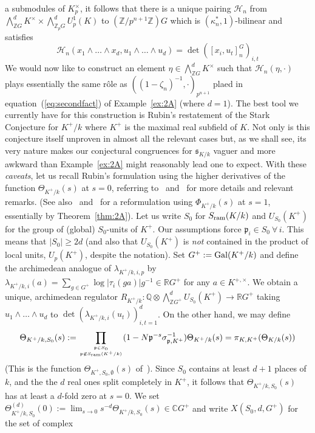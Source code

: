 \documentclass[12pt]{article}
\newcounter{rem}[section]%
\newcommand{\bbC}{\ensuremath{\mathbb{C}}}
\newcommand{\bbQ}{\ensuremath{\mathbb{Q}}}
\newcommand{\bbR}{\ensuremath{\mathbb{R}}}
\newcommand{\bbZ}{\ensuremath{\mathbb{Z}}}
\newcommand{\cH}{\ensuremath{\mathcal{H}}}
\newcommand{\fp}{\ensuremath{\mathfrak{p}}}
\newcommand{\fs}{\ensuremath{\mathfrak{s}}}
\newcommand{\Gal}{{\rm Gal}}
\newcommand{\inv}{^{-1}}%
\newcommand{\nin}{\not\in}
\newcommand{\refeq}[1]{~(\ref{eq:#1})}
\newcommand{\rem}{\refstepcounter{rem}\noindent{\sc Remark \therem}}%
\renewcommand{\therem}{\thesection.\arabic{rem}}
\newcommand{\pnpo}{\ensuremath{{p^{n+1}}}}
\newcommand{\sKk}{\ensuremath{\fs_{K/k}}}
\begin{document}
a submodules of $K_p^\times$, it follows that there is a
unique pairing
$\cH_n$ from
$\bigwedge^d_{\bbZ G}K^\times\times\bigwedge^d_{\bbZ_p G} U^1_p(K)$
to $(\bbZ/\pnpo\bbZ)G$ which
is $(\kappa_n^\ast,1)$-bilinear
and satisfies
\[
\cH_n(x_1\wedge\ldots\wedge x_d,u_1\wedge\ldots\wedge u_d)=\det([x_i,u_t]^G_n)_{i,t}
\]
We would now like to construct an element $\eta\in\bigwedge^d_{\bbZ G}K^\times$
such that $\cH_n(\eta,\cdot)$ plays essentially the same r\^ole as
$((1-\zeta_n)\inv,\cdot)_\pnpo$ plaed in equation\refeq{secondfact} of
Example~\ref{ex:2A} (where $d=1$).
The best tool we currently have for this construction is
Rubin's restatement of the Stark Conjecture for $K^+/k$
where $K^+$ is the maximal real subfield of $K$.
Not only is this conjecture itself unproven in almost all the relevant cases
but, as we shall see, its
very nature makes our conjectural congruences for $\sKk$ vaguer
and more awkward than Example~\ref{ex:2A} might
reasonably lead one to expect.
With these \emph{caveats}, let us recall Rubin's formulation using
the higher derivatives of the function $\Theta_{K^+/k}(s)$ at $s=0$,
referring to~\cite{Ru} and~\cite[\S4]{twizas} for more details and relevant remarks.
(See also~\cite[\S5]{twizas} and~\cite{sconzp} for a reformulation using
$\Phi_{K^+/k}(s)$ at $s=1$, essentially by Theorem~\ref{thm:2A}).
Let us write $S_0$ for $S_{\rm ram}(K/k)$ and
$U_{S_0}(K^+)$ for the group of (global) $S_0$-units of $K^+$.
Our assumptions force $\fp_i\in S_0\ \forall\,i$. This means that
$|S_0|\geq 2d$ (and also that $U_{S_0}(K^+)$
is \emph{not} contained in the product of local units, $U_p(K^+)$, despite the notation).
Set $G^+:=\Gal(K^+/k)$ and define the archimedean analogue of $\lambda_{K^+/k,i,p}$ by
$\lambda_{K^+/k,i}(a)=\sum_{g\in G^+}\log|\tau_i(ga)|g\inv\in \bbR G^+$
for any $a\in K^{+,\times}$. We obtain a
unique, archimedean regulator
$R_{K^+/k}:\bbQ\otimes\bigwedge^d_{\bbZ G^+}U_{S_0}(K^+)\rightarrow \bbR G^+$
taking $u_1\wedge\ldots\wedge u_d$ to $\det(\lambda_{K^+/k,i}(u_t))_{i,t=1}^d$.
On the other hand, we may define
\[
\Theta_{K^+/k, S_0}(s):=
\prod_{\fp\in S_0\atop \fp\nin S_{\rm ram}(K^+/k)}
(1-N\fp^{-s}\sigma_{\fp,K^+}\inv)\Theta_{K^+/k}(s)=
\pi_{K,K^+}(\Theta_{K/k}(s))
\]
(This is the function $\Theta_{K^+,S_0,\emptyset}(s)$ of~\cite{Ru}).
Since $S_0$ contains at least $d+1$ places of $k$,
and the the $d$ real ones split completely in $K^+$,
it follows that $\Theta_{K^+/k, S_0}(s)$ has at
least a $d$-fold zero at $s=0$. We set
$\Theta_{K^+/k, S_0}^{(d)}(0):=\lim_{s\rightarrow 0}s^{-d}\Theta_{K^+/k, S_0}(s)\in \bbC G^+$
and write $X(S_0,d,G^+)$ for the set of complex
\end{document}
